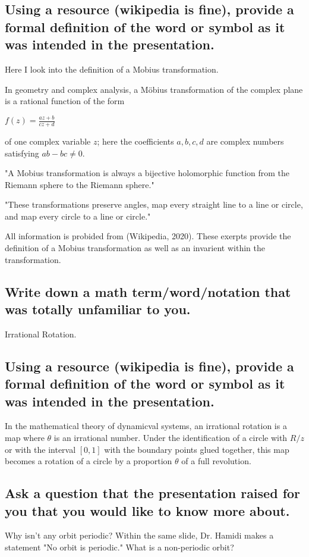 \subsection{Using a resource (wikipedia is fine), provide a formal definition of the word or symbol as it was intended in the presentation.}
Here I look into the definition of a Mobius transformation.

In geometry and complex analysis, a Möbius transformation of the complex plane is a rational function of the form

\begin{center}
  $f(z) = \frac{az+b}{cz+d}$
\end{center}
of one complex variable $z$; here the coefficients $a,b,c,d$ are complex numbers satisfying $ab-bc \neq 0$.

"A Mobius transformation is always a bijective holomorphic function from the Riemann sphere to the Riemann sphere."

"These transformations preserve angles, map every straight line to a line or circle, and map every circle to a line or circle."

All information is probided from (Wikipedia, 2020). These exerpts provide the definition of a Mobius transformation as well as an invarient within the transformation.

\subsection{Write down a math term/word/notation that was totally unfamiliar to you.}
Irrational Rotation.

\subsection{Using a resource (wikipedia is fine), provide a formal definition of the word or symbol as it was intended in the presentation.}
In the mathematical theory of dynamicval systems, an irrational rotation is a map where $\theta$ is an irrational number. Under the identification of a circle with $R/z$ or with the interval $[0,1]$ with the boundary points glued together, this map becomes a rotation of a circle by a proportion $\theta$ of a full revolution.

\subsection{Ask a question that the presentation raised for you that you would like to know more about.}
Why isn't any orbit periodic? Within the same slide, Dr. Hamidi makes a statement "No orbit is periodic." What is a non-periodic orbit?
